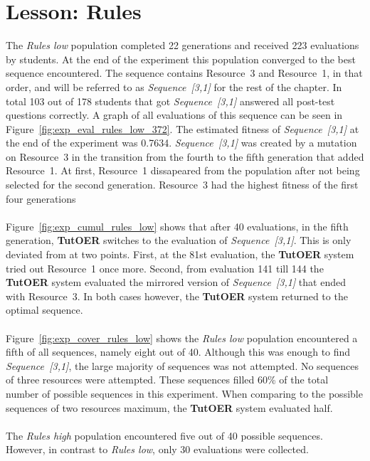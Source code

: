 \section{Lesson: Rules}
\label{sec:results_rules}
The \emph{Rules low} population completed 22 generations and received 
223 evaluations by students. At the end of the experiment
this population converged to the best sequence encountered. The
sequence contains Resource~3 and Resource~1, in that order, and will be
referred to as \emph{Sequence~[3,1]} for the rest of the chapter. In total 103
out of 178 students that got \emph{Sequence~[3,1]} answered all post-test
questions correctly. A graph of all evaluations of this sequence can be seen in
Figure~\ref{fig:exp_eval_rules_low_372}.
The estimated fitness of \emph{Sequence~[3,1]} at the end of the experiment was
0.7634. \emph{Sequence~[3,1]} was created by a mutation on Resource~3 in the transition
from the fourth to the fifth generation that added Resource~1. At first,
Resource~1 dissapeared from the population after not being selected for the
second generation. Resource~3 had the highest fitness of the first four
generations \\\\
\noindent
Figure~\ref{fig:exp_cumul_rules_low} shows that after 40 evaluations, in the fifth generation, \textbf{TutOER}
switches to the evaluation of \emph{Sequence~[3,1]}. This is only deviated from at
two points. First, at the 81st evaluation, the \textbf{TutOER} system tried out
Resource~1 once more. Second, from evaluation 141 till 144 the \textbf{TutOER}
system evaluated the mirrored version of \emph{Sequence~[3,1]} that ended with
Resource~3. In both cases however, the \textbf{TutOER} system returned to the
optimal sequence.\\\\
\noindent
Figure~\ref{fig:exp_cover_rules_low} shows the \emph{Rules low} population
encountered a fifth of all sequences, namely eight out of 40. Although this was
enough to find \emph{Sequence~[3,1]}, the large majority of sequences was not
attempted. No sequences of three resources were attempted. These sequences
filled 60\% of the total number of possible sequences in this experiment. When
comparing to the possible sequences of two resources maximum, the \textbf{TutOER}
system evaluated half.\\\\
\noindent
The \emph{Rules high} population encountered five out of 40 possible sequences.
However, in contrast to \emph{Rules low}, only 30 evaluations were collected.
